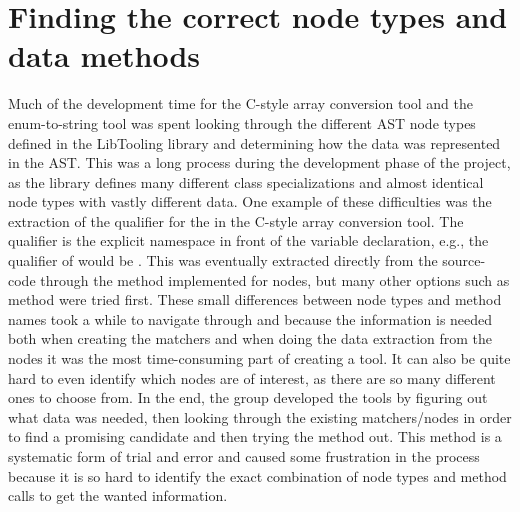 
\section{Finding the correct node types and data methods}

Much of the development time for the C-style array conversion tool and the enum-to-string tool was spent looking through the different AST node types defined in the LibTooling library and determining how the data was represented in the AST.
This was a long process during the development phase of the project, as the library defines many different class specializations and almost identical node types with vastly different data.
One example of these difficulties was the extraction of the qualifier for the  in the C-style array conversion tool.
The qualifier is the explicit namespace in front of the variable declaration, e.g., the qualifier of  would be .
This was eventually extracted directly from the source-code through the   method implemented for  nodes, but many other options such as  method were tried first.
These small differences between node types and method names took a while to navigate through and because the information is needed both when creating the matchers and when doing the data extraction from the nodes it was the most time-consuming part of creating a tool.
It can also be quite hard to even identify which nodes are of interest, as there are so many different ones to choose from.
In the end, the group developed the tools by figuring out what data was needed, then looking through the existing matchers/nodes in order to find a promising candidate and then trying the method out.
This method is a systematic form of trial and error and caused some frustration in the process because it is so hard to identify the exact combination of node types and method calls to get the wanted information.